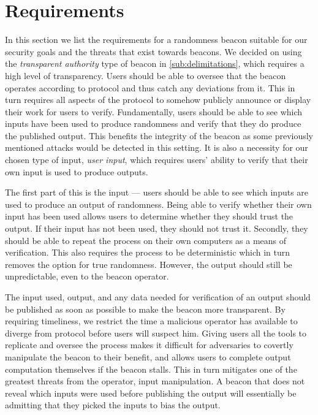 \section{Requirements}%
\label{sec:beacon_requirements}
In this section we list the requirements for a randomness beacon suitable for our security goals and the threats that exist towards beacons.
We decided on using the \emph{transparent authority} type of beacon in \cref{sub:delimitations}, which requires a high level of transparency.
Users should be able to oversee that the beacon operates according to protocol and thus catch any deviations from it.
This in turn requires all aspects of the protocol to somehow publicly announce or display their work for users to verify.
Fundamentally, users should be able to see which inputs have been used to produce randomness and verify that they do produce the published output.
This benefits the integrity of the beacon as some previously mentioned attacks would be detected in this setting.
It is also a necessity for our chosen type of input, \emph{user input}, which requires users' ability to verify that their own input is used to produce outputs.

The first part of this is the input --- users should be able to see which inputs are used to produce an output of randomness.
Being able to verify whether their own input has been used allows users to determine whether they should trust the output.
If their input has not been used, they should not trust it.
Secondly, they should be able to repeat the process on their own computers as a means of verification.
This also requires the process to be deterministic which in turn removes the option for true randomness.
However, the output should still be unpredictable, even to the beacon operator.

The input used, output, and any data needed for verification of an output should be published as soon as possible to make the beacon more transparent.
By requiring timeliness, we restrict the time a malicious operator has available to diverge from protocol before users will suspect him.
Giving users all the tools to replicate and oversee the process makes it difficult for adversaries to covertly manipulate the beacon to their benefit, and allows users to complete output computation themselves if the beacon stalls.
This in turn mitigates one of the greatest threats from the operator, input manipulation.
A beacon that does not reveal which inputs were used before publishing the output will essentially be admitting that they picked the inputs to bias the output.

